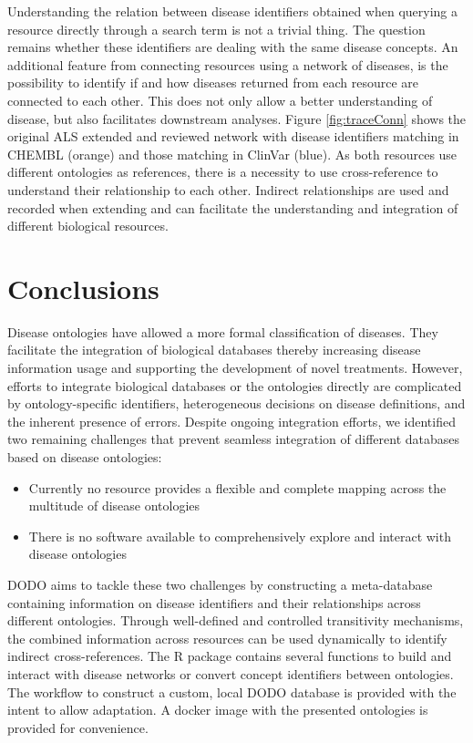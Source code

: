 \documentclass[9pt,a4paper,]{extarticle}
\begin{document}
Understanding the relation between disease identifiers obtained when querying a resource directly through a search term is not a trivial thing. The question remains whether these identifiers are dealing with the same disease concepts. An additional feature from connecting resources using a network of diseases, is the possibility to identify if and how diseases returned from each resource are connected to each other. This does not only allow a better understanding of disease, but also facilitates downstream analyses. Figure \ref{fig:traceConn} shows the original ALS extended and reviewed network with disease identifiers matching in CHEMBL (orange) and those matching in ClinVar (blue). As both resources use different ontologies as references, there is a necessity to use cross-reference to understand their relationship to each other. Indirect relationships are used and recorded when extending and can facilitate the understanding and integration of different biological resources.

\hypertarget{conclusions}{%
\section{Conclusions}\label{conclusions}}

Disease ontologies have allowed a more formal classification of diseases. They facilitate the integration of biological databases thereby increasing disease information usage and supporting the development of novel treatments. However, efforts to integrate biological databases or the ontologies directly are complicated by ontology-specific identifiers, heterogeneous decisions on disease definitions, and the inherent presence of errors. Despite ongoing integration efforts, we identified two remaining challenges that prevent seamless integration of different databases based on disease ontologies:

\begin{itemize}
\item
  Currently no resource provides a flexible and complete mapping across the multitude of disease ontologies
\item
  There is no software available to comprehensively explore and interact with disease ontologies
\end{itemize}

DODO aims to tackle these two challenges by constructing a meta-database containing information on disease identifiers and their relationships across different ontologies. Through well-defined and controlled transitivity mechanisms, the combined information across resources can be used dynamically to identify indirect cross-references. The R package contains several functions to build and interact with disease networks or convert concept identifiers between ontologies. The workflow to construct a custom, local DODO database is provided with the intent to allow adaptation. A docker image with the presented ontologies is provided for convenience.
\end{document}
